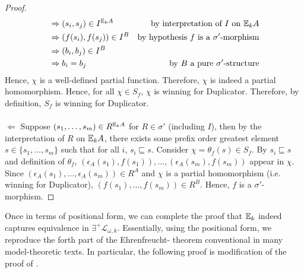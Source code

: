 \begin{thm}
\begin{proof}
\begin{align*}
&\Rightarrow (s_{i},s_{j}) \in I^{{\mathbb{E}_{k}A}} & \text{by interpretation of $I$ on ${\mathbb{E}_{k}A}$} \\
&\Rightarrow (f(s_{i}),f(s_{j})) \in I^{B} & \text{by hypothesis $f$ is a $\sigma'$-morphism} \\
&\Rightarrow (b_{i},b_{j}) \in I^{B}\\
&\Rightarrow b_{i} = b_{j} & \text{by $B$ a pure $\sigma'$-structure}
\end{align*}
Hence, $\chi$ is a well-defined partial function.
Therefore, $\chi$ is indeed a partial homomorphism. Hence, for all $\chi \in S_{f}$, $\chi$ is winning for Duplicator. Therefore, by definition, $S_{f}$ is winning for Duplicator.
\\~\\
$\Leftarrow$ Suppose $(s_{1},\dots,s_{m}) \in R^{{\mathbb{E}_{k}A}}$ for $R \in \sigma'$ (including $I$), then by the interpretation of $R$ on ${\mathbb{E}_{k}A}$, there exists some prefix order greatest element $s \in \{s_{1},\dots,s_{m}\}$ such that for all $i$, $s_{i} \sqsubseteq s$. Consider $\chi = \theta_{f}(s) \in S_{f}$. By $s_{i} \sqsubseteq s$ and definition of $\theta_{f}$, $(\epsilon_{A}(s_{1}),f(s_{1})),\dots, (\epsilon_{A}(s_{m}),f(s_{m}))$ appear in $\chi$. Since $(\epsilon_{A}(s_{1}),\dots,\epsilon_{A}(s_{m})) \in R^{A}$ and $\chi$ is a partial homomorphism (i.e. winning for Duplicator), $(f(s_{1}),\dots,f(s_{m})) \in R^{B}$. Hence, $f$ is a $\sigma'$-morphism.
\end{proof}
\label{thm:toPositionalFormEF}
\end{thm}
Once in terms of positional form, we can complete the proof that ${\mathbb{E}_{k}}$ indeed captures equivalence in $\exists^{+}\mathcal{L}_{\omega,k}$. Essentially, using the positional form, we reproduce the forth part of the Ehrenfreucht-{\Fraisse} theorem conventional in many model-theoretic texts. In particular, the following proof is modification of the proof of \cite[Theorem 3.18]{Libkin2004}. 
